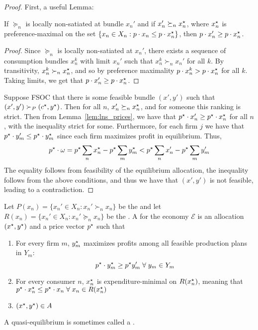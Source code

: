 \documentclass[10pt]{article}
\begin{document}
\begin{proof}
	First, a useful Lemma:
	\begin{lemma}\label{lem:lns_prices}
		If $\succeq_n$ is locally non-satiated at bundle $x_n'$ and if $x_n' \succeq_n x_n^\star$, where $x^\star_n$ is preference-maximal on the set $\{x_n \in X_n : p\cdot x_n \le p \cdot x_n^\star\}$, then $p \cdot x_n' \ge p \cdot x_n^\star$.
	\end{lemma}
	\begin{proof}
		Since $\succeq_n$ is locally non-satiated at $x_n'$, there exists a sequence of consumption bundles $x_n^k$ with limit $x_n'$ such that $x_n^k \succ_n x_n'$ for all $k$. By transitivity, $x_n^k \succ_n x_n^\star$, and so by preference maximality $p \cdot x_n^k > p \cdot x_n^\star$ for all $k$. Taking limits, we get that $p \cdot x_n' \ge p \cdot x_n^\star$.
	\end{proof}
	
	Suppose FSOC that there is some feasible bundle $(x',y')$ such that $(x',y') \succ_P (c^\star,y^\star)$. Then for all $n$, $x_n' \succeq_n x_n^\star$, and for someone this ranking is strict. Then from Lemma~\ref	{lem:lns_prices}, we have that $p^\star \cdot x_n' \ge p^\star \cdot x_n^\star$ for all $n$, with the inequality strict for some. Furthermore, for each firm $j$ we have that $p^\star \cdot y_m' \le p^\star \cdot y_m^\star$ since each firm maximizes profit in equilibrium. Thus,\[p^\star \cdot \omega = p^\star \sum_n x_n^\star - p^\star \sum_m y_m^\star < p^\star \sum_n x_n' - p^\star \sum_m y_m'\]The equality follows from feasibility of the equilibrium allocation, the inequality follows from the above conditions, and thus we have that $(x',y')$ is not feasible, leading to a contradiction.
\end{proof}


\begin{definition}
	Let $P(x_n) = \{x_n' \in X_n : x_n' \succ_n x_n\}$ be the  and let $R(x_n) = \{x_n' \in X_n : x_n' \succeq_n x_n\}$ be the . A  for the economy $\mathcal{E}$ is an allocation $(x^\star,y^\star)$ and a price vector $p^\star$ such that 
	\begin{enumerate}
		\item For every firm $m$, $y^\star_m$ maximizes profits among all feasible production plans in $Y_m$: \[p\opt \cdot y_m\opt \ge p\opt y_m' \forall y_m \in Y_m\]
		\item For every consumer $n$, $x_n^\star$ is expenditure-minimal on $R(x_n^\star)$, meaning that $p\opt \cdot x_n\opt \le p\opt \cdot x_n \forall x_n \in R(x_n\opt)$
		\item $(x^\star,y^\star) \in A$
	\end{enumerate}
	A quasi-equilibrium is sometimes called a .
\end{definition}
\end{document}
